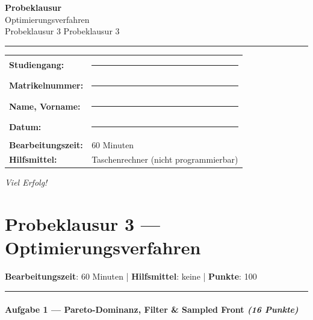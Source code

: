 \documentclass[11pt, a4paper]{article}
\providecommand{\nichttitle}{Probeklausur}
\providecommand{\nichtsubtitle}{}
\renewcommand{\nichttitle}{Optimierungsverfahren}
\renewcommand{\nichtsubtitle}{Probeklausur 3}
\begin{document}
\thispagestyle{empty}
\begin{center}
\vspace*{1cm}
{\Huge\bfseries\color{accent}Probeklausur}\\[8pt]
{\Large\color{accent}\nichttitle}\\[4pt]
\ifx\nichtsubtitle\empty\else
  {\large\color{accent!80!black}\nichtsubtitle}\\[6pt]
\fi
\color{accent}\rule{0.5\linewidth}{1pt}\color{black}
\end{center}

\vspace{1cm}
\begin{tabularx}{\textwidth}{@{}l X@{}}
\textbf{Studiengang:}      & \rule{6cm}{0.4pt} \\[6pt]
\textbf{Matrikelnummer:}    & \rule{6cm}{0.4pt} \\[6pt]
\textbf{Name, Vorname:}    & \rule{6cm}{0.4pt} \\[6pt]
\textbf{Datum:}             & \rule{6cm}{0.4pt} \\[6pt]
\textbf{Bearbeitungszeit:}  & 60 Minuten \\[6pt]
\textbf{Hilfsmittel:}       & Taschenrechner (nicht programmierbar) \\
\end{tabularx}

\vspace{2cm}
\begin{center}
{\large\itshape Viel Erfolg!}
\end{center}

\newpage


\section{Probeklausur 3 — Optimierungsverfahren}

\textbf{Bearbeitungszeit}: 60 Minuten | \textbf{Hilfsmittel}: keine | \textbf{Punkte}: 100



\noindent\textcolor{rulegray}{\rule{\linewidth}{0.4pt}}


\paragraph{Aufgabe 1 — Pareto-Dominanz, Filter \& Sampled Front \textit{(16 Punkte)}}\mbox{}\\[2pt]
\end{document}
